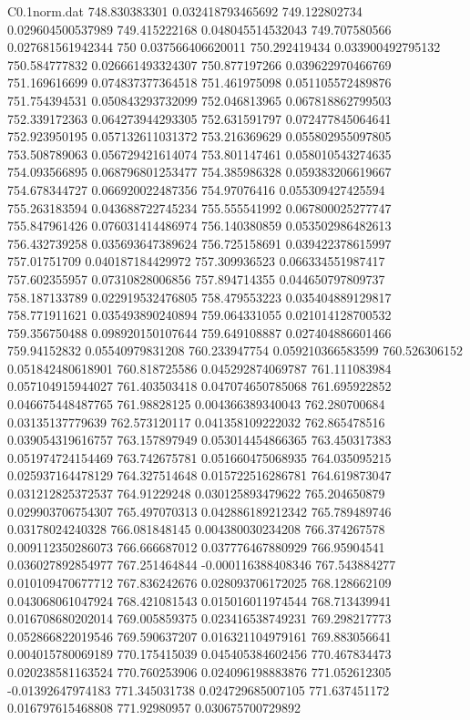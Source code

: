 \begin{filecontents}{C0.1norm.dat}
748.830383301		0.032418793465692
749.122802734		0.029604500537989
749.415222168		0.048045514532043
749.707580566		0.027681561942344
750		0.037566406620011
750.292419434		0.033900492795132
750.584777832		0.026661493324307
750.877197266		0.039622970466769
751.169616699		0.074837377364518
751.461975098		0.051105572489876
751.754394531		0.050843293732099
752.046813965		0.067818862799503
752.339172363		0.064273944293305
752.631591797		0.072477845064641
752.923950195		0.057132611031372
753.216369629		0.055802955097805
753.508789063		0.056729421614074
753.801147461		0.058010543274635
754.093566895		0.068796801253477
754.385986328		0.059383206619667
754.678344727		0.066920022487356
754.97076416		0.055309427425594
755.263183594		0.043688722745234
755.555541992		0.067800025277747
755.847961426		0.076031414486974
756.140380859		0.053502986482613
756.432739258		0.035693647389624
756.725158691		0.039422378615997
757.01751709		0.040187184429972
757.309936523		0.066334551987417
757.602355957		0.07310828006856
757.894714355		0.044650797809737
758.187133789		0.022919532476805
758.479553223		0.035404889129817
758.771911621		0.035493890240894
759.064331055		0.021014128700532
759.356750488		0.098920150107644
759.649108887		0.027404886601466
759.94152832		0.05540979831208
760.233947754		0.059210366583599
760.526306152		0.051842480618901
760.818725586		0.045292874069787
761.111083984		0.057104915944027
761.403503418		0.047074650785068
761.695922852		0.046675448487765
761.98828125		0.004366389340043
762.280700684		0.03135137779639
762.573120117		0.041358109222032
762.865478516		0.039054319616757
763.157897949		0.053014454866365
763.450317383		0.051974724154469
763.742675781		0.051660475068935
764.035095215		0.025937164478129
764.327514648		0.015722516286781
764.619873047		0.031212825372537
764.91229248		0.030125893479622
765.204650879		0.029903706754307
765.497070313		0.042886189212342
765.789489746		0.03178024240328
766.081848145		0.004380030234208
766.374267578		0.009112350286073
766.666687012		0.037776467880929
766.95904541		0.036027892854977
767.251464844		-0.000116388408346
767.543884277		0.010109470677712
767.836242676		0.028093706172025
768.128662109		0.043068061047924
768.421081543		0.015016011974544
768.713439941		0.016708680202014
769.005859375		0.023416538749231
769.298217773		0.052866822019546
769.590637207		0.016321104979161
769.883056641		0.004015780069189
770.175415039		0.045405384602456
770.467834473		0.020238581163524
770.760253906		0.024096198883876
771.052612305		-0.01392647974183
771.345031738		0.024729685007105
771.637451172		0.016797615468808
771.92980957		0.030675700729892

\end{filecontents}
